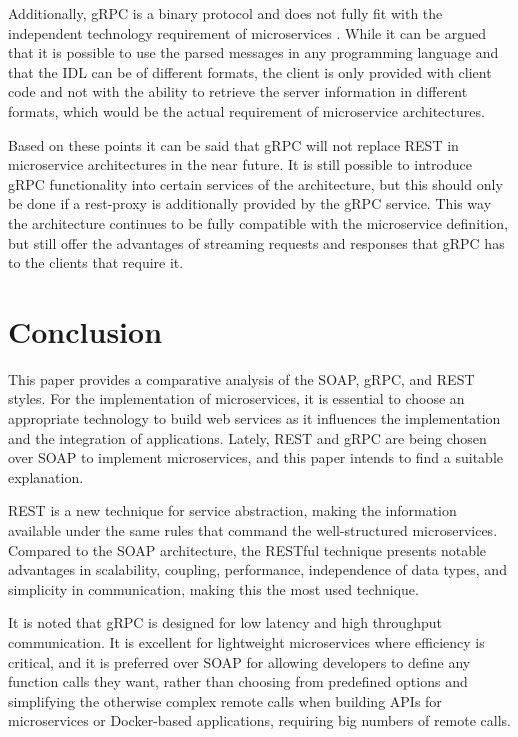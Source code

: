 \documentclass[conference]{IEEEtran}
\begin{document}
Additionally, gRPC is a binary protocol and does not fully fit with the independent technology requirement of microservices \cite{karmel2016nist}. While it can be argued that it is possible to use the parsed messages in any programming language and that the IDL can be of different formats, the client is only provided with client code and not with the ability to retrieve the server information in different formats, which would be the actual requirement of microservice architectures.

Based on these points it can be said that gRPC will not replace REST in microservice architectures in the near future. It is still possible to introduce gRPC functionality into certain services of the architecture, but this should only be done if a rest-proxy is additionally provided by the gRPC service. This way the architecture continues to be fully compatible with the microservice definition, but still offer the advantages of streaming requests and responses that gRPC has to the clients that require it.

\section{Conclusion}

This paper provides a comparative analysis of the SOAP, gRPC, and REST styles. For the implementation of microservices, it is essential to choose an appropriate technology to build web services as it influences the implementation and the integration of applications. Lately, REST and gRPC are being chosen over SOAP to implement microservices, and this paper intends to find a suitable explanation. 

REST is a new technique for service abstraction, making the information available under the same rules that command the well-structured microservices. Compared to the SOAP architecture, the RESTful technique presents notable advantages in scalability, coupling, performance, independence of data types, and simplicity in communication, making this the most used technique.

It is noted that gRPC is designed for low latency and high throughput communication. It is excellent for lightweight microservices where efficiency is critical, and it is preferred over SOAP for allowing developers to define any function calls they want, rather than choosing from predefined options and simplifying the otherwise complex remote calls when building APIs for microservices or Docker-based applications, requiring big numbers of remote calls.
\end{document}
